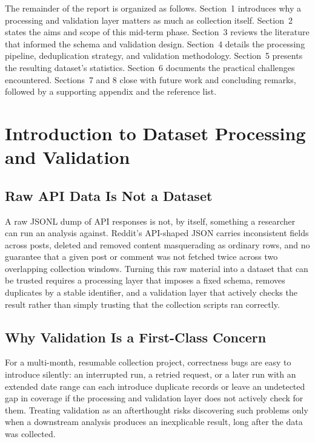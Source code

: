 \documentclass[12pt]{article}
\begin{document}
The remainder of the report is organized as follows. Section~1 introduces why a processing and
validation layer matters as much as collection itself. Section~2 states the aims and scope of this
mid-term phase. Section~3 reviews the literature that informed the schema and validation design.
Section~4 details the processing pipeline, deduplication strategy, and validation methodology.
Section~5 presents the resulting dataset's statistics. Section~6 documents the practical
challenges encountered. Sections~7 and 8 close with future work and concluding remarks, followed
by a supporting appendix and the reference list.

\clearpage

\section{Introduction to Dataset Processing and Validation}

\subsection{Raw API Data Is Not a Dataset}
A raw JSONL dump of API responses is not, by itself, something a researcher can run an analysis
against. Reddit's API-shaped JSON carries inconsistent fields across posts, deleted and removed
content masquerading as ordinary rows, and no guarantee that a given post or comment was not
fetched twice across two overlapping collection windows. Turning this raw material into a dataset
that can be trusted requires a processing layer that imposes a fixed schema, removes duplicates
by a stable identifier, and a validation layer that actively checks the result rather than simply
trusting that the collection scripts ran correctly.

\subsection{Why Validation Is a First-Class Concern}
For a multi-month, resumable collection project, correctness bugs are easy to introduce
silently: an interrupted run, a retried request, or a later run with an extended date range can
each introduce duplicate records or leave an undetected gap in coverage if the processing and
validation layer does not actively check for them. Treating validation as an afterthought risks
discovering such problems only when a downstream analysis produces an inexplicable result, long
after the data was collected.
\end{document}
